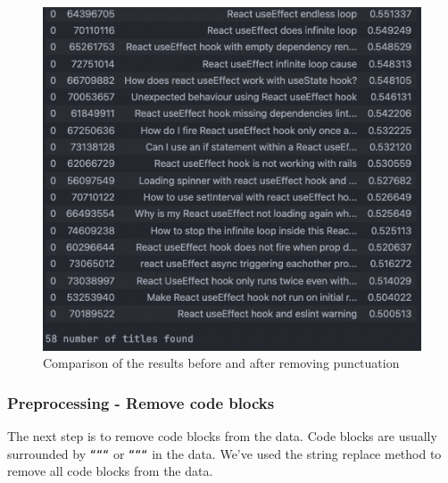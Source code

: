 \begin{figure}[H]
  \noindent \includegraphics[scale=0.45]{assets/spacy-query-1-results-1.png}
\caption{Comparison of the results before and after removing punctuation }\label{punctuation_comparison}
\end{figure}

\subsubsection{Preprocessing - Remove code blocks}
The next step is to remove code blocks from the data. Code blocks are usually surrounded by \texttt{``````} or \texttt{``````} in the data. We've used the string replace method to remove all code blocks from the data.

